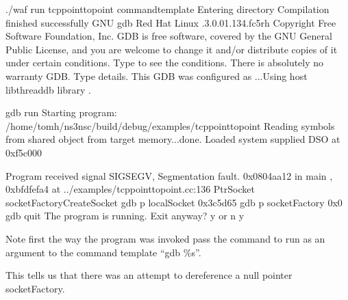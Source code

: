 \documentclass[letterpaper,10pt,english]{sphinxmanual}
\begin{document}
\begin{sphinxVerbatim}[commandchars=\\\{\}]
\PYGZdl{} ./waf \PYGZhy{}\PYGZhy{}run tcp\PYGZhy{}point\PYGZhy{}to\PYGZhy{}point \PYGZhy{}\PYGZhy{}command\PYGZhy{}template
Entering directory 
Compilation finished successfully
GNU gdb Red Hat Linux .3.0.0\PYGZhy{}1.134.fc5rh
Copyright  Free Software Foundation, Inc.
GDB is free software, covered by the GNU General Public License, and you are
welcome to change it and/or distribute copies of it under certain conditions.
Type  to see the conditions.
There is absolutely no warranty  GDB.  Type   details.
This GDB was configured as ...Using host libthread\PYGZus{}db
library .

gdb run
Starting program: /home/tomh/ns\PYGZhy{}3\PYGZhy{}nsc/build/debug/examples/tcp\PYGZhy{}point\PYGZhy{}to\PYGZhy{}point
Reading symbols from shared object  from target memory...done.
Loaded system supplied DSO at 0xf5c000

Program received signal SIGSEGV, Segmentation fault.
0x0804aa12 in main , 0xbfdfefa4
    at ../examples/tcp\PYGZhy{}point\PYGZhy{}to\PYGZhy{}point.cc:136
       Ptr\PYGZlt{}Socket\PYGZgt{}   socketFactory\PYGZhy{}\PYGZgt{}CreateSocket 
gdb p localSocket
    0x3c5d65
gdb p socketFactory
    0x0
gdb quit
The program is running.  Exit anyway? y or n y
\end{sphinxVerbatim}

Note first the way the program was invoked\textendash{} pass the command to run as an
argument to the command template “gdb \%s”.

This tells us that there was an attempt to dereference a null pointer
socketFactory.
\end{document}
